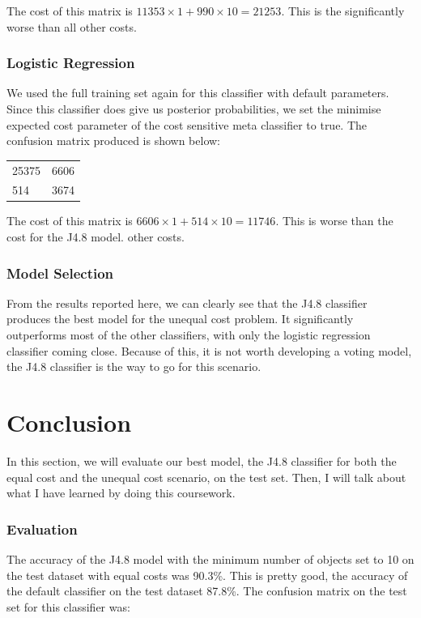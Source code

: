 \documentclass[a4paper,11pt]{article}
\begin{document}
The cost of this matrix is $ 11353 \times 1 + 990 \times 10 = 21253 $. This is the significantly worse than all
other costs.

\subsubsection{Logistic Regression}

We used the full training set again for this classifier with default parameters. Since this classifier does give
us posterior probabilities, we set the minimise expected cost parameter of the cost sensitive meta classifier
to true. The confusion matrix produced is shown below:

\begin{table}[H]
  \begin{center}
    \begin{tabular}{l l }
      25375 & 6606 \\
      514 & 3674 \\
    \end{tabular}
  \end{center}
  \label{tab:LogisticCost}
\end{table}

The cost of this matrix is $ 6606 \times 1 + 514 \times 10 = 11746 $. This is worse than the cost for the J4.8 model.
other costs.

\subsubsection{Model Selection}
From the results reported here, we can clearly see that the J4.8 classifier produces the best model for the unequal
cost problem. It significantly outperforms most of the other classifiers, with only the logistic regression classifier
coming close. Because of this, it is not worth developing a voting model, the J4.8 classifier is the way to go for
this scenario.

\section{Conclusion}

In this section, we will evaluate our best model, the J4.8 classifier for both the equal cost and the unequal cost scenario,
on the test set. Then, I will talk about what I have learned by doing this coursework.

\subsubsection{Evaluation}
The accuracy of the J4.8 model with the minimum number of objects set to 10 on the test dataset with equal costs was 90.3\%.
This is pretty good, the accuracy of the default classifier on the test dataset 87.8\%. The confusion matrix on the test set
for this classifier was:
\end{document}
